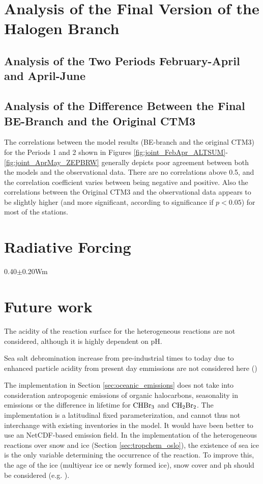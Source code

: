 \section{Analysis of the Final Version of the Halogen Branch}\label{sec:disc_final_Version}

\subsection{Analysis of the Two Periods February-April and April-June}\label{sec:disc_twoPeriods}

\subsection{Analysis of the Difference Between the Final BE-Branch and the Original CTM3}\label{sec:disc_origBE}

The correlations between the model results (BE-branch and the original CTM3) for the Periods 1 and 2 shown in Figures \ref{fig:joint_FebApr_ALTSUM}-\ref{fig:joint_AprMay_ZEPBRW} generally depicts poor agreement between both the models and the observational data. There are no correlations above 0.5, and the correlation coefficient varies between being negative and positive. Also the correlations between the Original CTM3 and the observational data appears to be slightly higher (and more significant, according to significance if $p<0.05$) for most of the stations. 


\section{Radiative Forcing}\label{sec:disc_RF}

0.40$\pm$0.20Wm \cite{IPCCchapter8}

\section{Future work}

The acidity of the reaction surface for the heterogeneous reactions are not considered, although it is highly dependent on pH. 

\medskip
Sea salt debromination increase from pre-industrial times to today due to enhanced particle acidity from present day emmissions are not considered here (\cite{Parella})

\medskip
The implementation in Section \ref{sec:oceanic_emissions} does not take into consideration antropogenic emissions of organic halocarbons, seasonality in emissions or the difference in lifetime for $\mathrm{CHBr_3}$ and $\mathrm{CH_2Br_2}$. The implementation is a latitudinal fixed parameterization, and cannot thus not interchange with existing inventories in the model. It would have been better to use an NetCDF-based emission field. 
\medskip
In the implementation of the heterogeneous reactions over snow and ice (Section \ref{sec:tropchem_oslo}), the existence of sea ice is the only variable determining the occurrence of the reaction. To improve this, the age of the ice (multiyear ice or newly formed ice), snow cover and ph should be considered (e.g. \cite{Peterson2019}).

